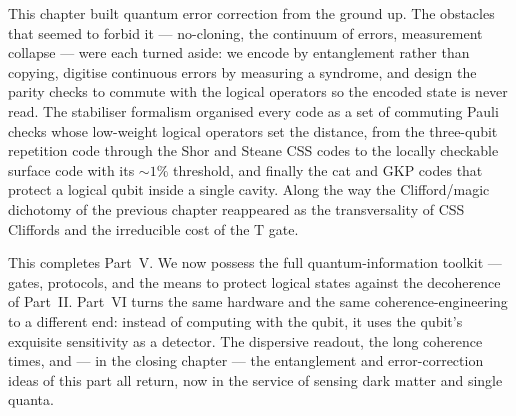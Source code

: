 This chapter built quantum error correction from the ground up. The
obstacles that seemed to forbid it --- no-cloning, the continuum of
errors, measurement collapse --- were each turned aside: we encode by
entanglement rather than copying, digitise continuous errors by
measuring a syndrome, and design the parity checks to commute with the
logical operators so the encoded state is never read. The stabiliser
formalism organised every code as a set of commuting Pauli checks whose
low-weight logical operators set the distance, from the three-qubit
repetition code through the Shor and Steane CSS codes to the locally
checkable surface code with its $\sim\!1\%$ threshold, and finally the
cat and GKP codes that protect a logical qubit inside a single cavity.
Along the way the Clifford/magic dichotomy of the previous chapter
reappeared as the transversality of CSS Cliffords and the irreducible
cost of the $\mathrm{T}$ gate.

This completes Part~V. We now possess the full quantum-information
toolkit --- gates, protocols, and the means to protect logical states
against the decoherence of Part~II. Part~VI turns the same hardware and
the same coherence-engineering to a different end: instead of computing
with the qubit, it uses the qubit's exquisite sensitivity as a detector.
The dispersive readout, the long coherence times, and --- in the closing
chapter --- the entanglement and error-correction ideas of this part all
return, now in the service of sensing dark matter and single quanta.

